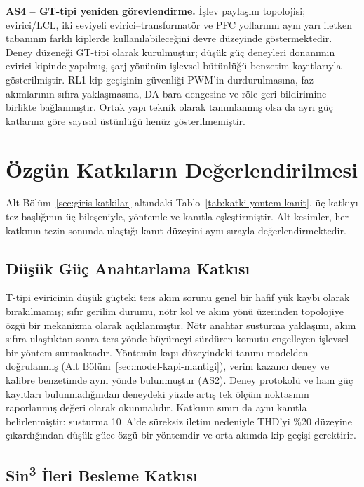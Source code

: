 \textbf{AS4 -- GT-tipi yeniden görevlendirme.} İşlev paylaşım topolojisi; evirici/LCL, iki seviyeli evirici--transformatör ve PFC yollarının aynı yarı iletken tabanının farklı kiplerde kullanılabileceğini devre düzeyinde göstermektedir. Deney düzeneği GT-tipi olarak kurulmuştur; düşük güç deneyleri donanımın evirici kipinde yapılmış, şarj yönünün işlevsel bütünlüğü benzetim kayıtlarıyla gösterilmiştir. RL1 kip geçişinin güvenliği PWM'in durdurulmasına, faz akımlarının sıfıra yaklaşmasına, DA bara dengesine ve röle geri bildirimine birlikte bağlanmıştır. Ortak yapı teknik olarak tanımlanmış olsa da ayrı güç katlarına göre sayısal üstünlüğü henüz gösterilmemiştir.

\section{Özgün Katkıların Değerlendirilmesi}

Alt Bölüm~\ref{sec:giris-katkilar} altındaki Tablo~\ref{tab:katki-yontem-kanit}, üç katkıyı tez başlığının üç bileşeniyle, yöntemle ve kanıtla eşleştirmiştir. Alt kesimler, her katkının tezin sonunda ulaştığı kanıt düzeyini aynı sırayla değerlendirmektedir.

\subsection{Düşük Güç Anahtarlama Katkısı}

T-tipi eviricinin düşük güçteki ters akım sorunu genel bir hafif yük kaybı olarak bırakılmamış; sıfır gerilim durumu, nötr kol ve akım yönü üzerinden topolojiye özgü bir mekanizma olarak açıklanmıştır. Nötr anahtar susturma yaklaşımı, akım sıfıra ulaştıktan sonra ters yönde büyümeyi sürdüren komutu engelleyen işlevsel bir yöntem sunmaktadır. Yöntemin kapı düzeyindeki tanımı modelden doğrulanmış (Alt Bölüm~\ref{sec:model-kapi-mantigi}), verim kazancı deney ve kalibre benzetimde aynı yönde bulunmuştur (AS2). Deney protokolü ve ham güç kayıtları bulunmadığından deneydeki yüzde artış tek ölçüm noktasının raporlanmış değeri olarak okunmalıdır. Katkının sınırı da aynı kanıtla belirlenmiştir: susturma \SI{10}{\ampere}'de süreksiz iletim nedeniyle THD'yi \%20 düzeyine çıkardığından düşük güce özgü bir yöntemdir ve orta akımda kip geçişi gerektirir.

\subsection{Sin\textsuperscript{3} İleri Besleme Katkısı}

